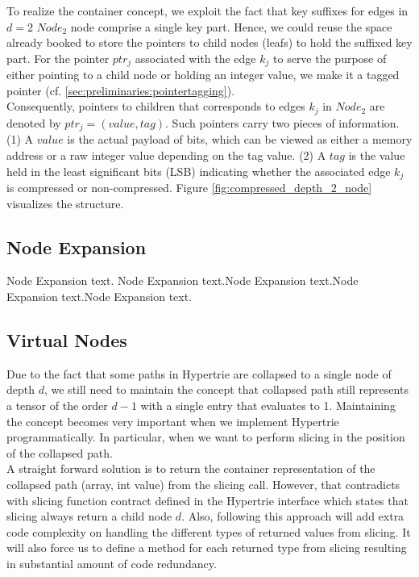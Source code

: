 To realize the container concept, we exploit the fact that key suffixes for edges in $d=2$ $Node_{2}$ node comprise a single key part.
Hence, we could reuse the space already booked to store the pointers to child nodes (leafs) to hold the suffixed key part.
For the pointer $ptr_{j}$ associated with the edge $k_{j}$ to serve the purpose of either pointing to a child node or holding an integer value, we make it a tagged pointer (cf. \ref{sec:preliminaries:pointertagging}). \\

Consequently, pointers to children that corresponds to edges $k_{j}$ in $Node_{2}$ are denoted by $ptr_{j} = (value, tag)$. Such pointers carry two pieces of information. (1) A $value$ is the actual payload of bits, which can be viewed as either a memory address or a raw integer value depending on the tag value. (2) A $tag$ is the value held in the least significant bits (LSB) indicating whether the associated edge $k_{j}$ is compressed or non-compressed. Figure \ref{fig:compressed_depth_2_node} visualizes the structure.

\subsection{Node Expansion}
Node Expansion text. Node Expansion text.Node Expansion text.Node Expansion text.Node Expansion text.

\subsection{Virtual Nodes}
Due to the fact that some paths in Hypertrie are collapsed to a single node of depth $d$, we still need to maintain the concept that collapsed path still represents a tensor of the order $d-1$ with a single entry that evaluates to 1. Maintaining the concept becomes very important when we implement Hypertrie programmatically. In particular, when we want to perform slicing in the position of the collapsed path. \\

A straight forward solution is to return the container representation of the collapsed path (array, int value) from the slicing call. However, that contradicts with slicing function contract defined in the Hypertrie interface which states that slicing always return a child node $d$. Also, following this approach will add extra code complexity on handling the different types of returned values from slicing. It will also force us to define a method for each returned type from slicing resulting in substantial amount of code redundancy.  \\

